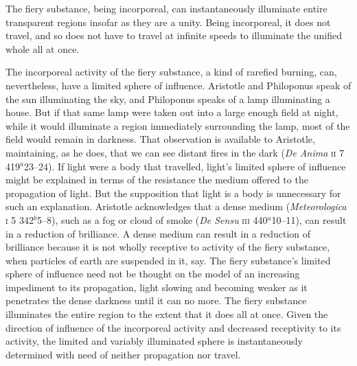 The fiery substance, being incorporeal, can instantaneously illuminate entire transparent regions insofar as they are a unity. Being incorporeal, it does not travel, and so does not have to travel at infinite speeds to illuminate the unified whole all at once. 

The incorporeal activity of the fiery substance, a kind of rarefied burning, can, nevertheless, have a limited sphere of influence. Aristotle and Philoponus speak of the sun illuminating the sky, and Philoponus speaks of a lamp illuminating a house. But if that same lamp were taken out into a large enough field at night, while it would illuminate a region immediately surrounding the lamp, most of the field would remain in darkness. That observation is available to Aristotle, maintaining, as he does, that we can see distant fires in the dark (\emph{De Anima} \textsc{ii} 7 419\( ^{a} \)23--24). If light were a body that travelled, light's limited sphere of influence might be explained in terms of the resistance the medium offered to the propagation of light. But the supposition that light is a body is unnecessary for such an explanation. Aristotle acknowledges that a dense medium (\emph{Meteorologica} \textsc{i} 5 342\( ^{b} \)5--8), such as a fog or cloud of smoke (\emph{De Sensu} \textsc{iii} 440\( ^{a} \)10--11), can result in a reduction of brilliance. A dense medium can result in a reduction of brilliance because it is not wholly receptive to activity of the fiery substance, when particles of earth are suspended in it, say. The fiery substance's limited sphere of influence need not be thought on the model of an increasing impediment to its propagation, light slowing and becoming weaker as it penetrates the dense darkness until it can no more. The fiery substance illuminates the entire region to the extent that it does all at once. Given the direction of influence of the incorporeal activity and decreased receptivity to its activity, the limited and variably illuminated sphere is instantaneously determined with need of neither propagation nor travel.

